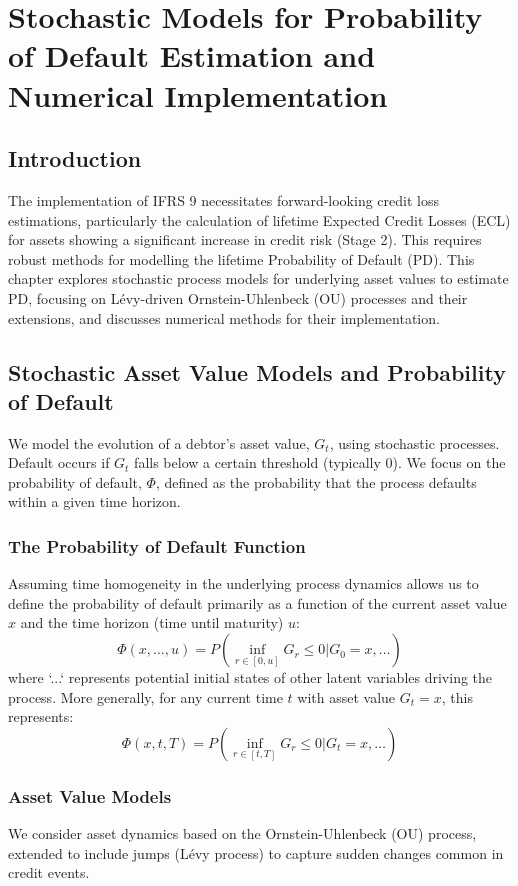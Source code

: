 \documentclass[11pt,twoside,openright]{report}
\begin{document}
\chapter{Stochastic Models for Probability of Default Estimation and Numerical Implementation}

\section{Introduction}

The implementation of IFRS 9 necessitates forward-looking credit loss estimations, particularly the calculation of lifetime Expected Credit Losses (ECL) for assets showing a significant increase in credit risk (Stage 2). This requires robust methods for modelling the lifetime Probability of Default (PD). This chapter explores stochastic process models for underlying asset values to estimate PD, focusing on Lévy-driven Ornstein-Uhlenbeck (OU) processes and their extensions, and discusses numerical methods for their implementation.

\section{Stochastic Asset Value Models and Probability of Default}

We model the evolution of a debtor's asset value, $G_t$, using stochastic processes. Default occurs if $G_t$ falls below a certain threshold (typically 0). We focus on the probability of default, $\Phi$, defined as the probability that the process defaults within a given time horizon.

\subsection{The Probability of Default Function}
Assuming time homogeneity in the underlying process dynamics allows us to define the probability of default primarily as a function of the current asset value $x$ and the time horizon (time until maturity) $u$:
$$ \Phi(x, \dots, u) = P\left( \inf_{r \in [0, u]} G_r \le 0 | G_0 = x, \dots \right) $$
where `...` represents potential initial states of other latent variables driving the process. More generally, for any current time $t$ with asset value $G_t = x$, this represents:
$$ \Phi(x, t, T) = P\left( \inf_{r \in [t, T]} G_r \le 0 | G_t = x, \dots \right) $$

\subsection{Asset Value Models}
We consider asset dynamics based on the Ornstein-Uhlenbeck (OU) process, extended to include jumps (Lévy process) to capture sudden changes common in credit events.
\end{document}
